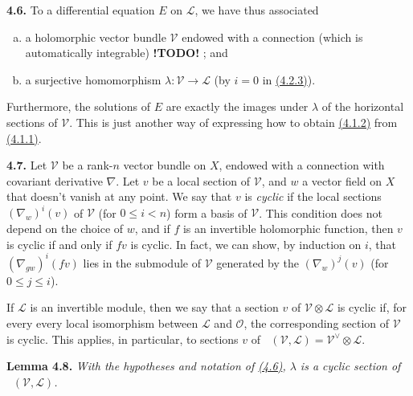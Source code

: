 \documentclass{report}
\newenvironment{itenv}[1]
  {\phantomsection\par\medskip\noindent\textbf{#1.}\itshape}
  {\medskip}
\newenvironment{rmenv}[1]
  {\phantomsection\par\medskip\noindent\textbf{#1.}\rmfamily}
  {\medskip}
\newcommand{\scr}[1]{{\mathscr{#1}}}
\renewcommand{\cal}[1]{{\mathcal{#1}}}
\renewcommand{\leq}{\leqslant}
\DeclareMathOperator{\shHom}{\underline{Hom}}
\newcommand{\todo}{\textbf{ !TODO! }}
\newcommand{\oldpage}[1]{\marginpar{\footnotesize$\Big\vert$ \textit{p.~#1}}}
\begin{document}
\begin{rmenv}{4.6}
\label{I.4.6}
  To a differential equation $E$ on $\scr{L}$, we have thus associated
  \begin{enumerate}[a)]
    \item a holomorphic vector bundle $\scr{V}$ endowed with a connection (which is automatically integrable) \todo ; and
    \item a surjective homomorphism $\lambda\colon\scr{V}\to\scr{L}$ (by $i=0$ in \hyperref[I.4.2.3]{(4.2.3)}).
  \end{enumerate}
  Furthermore, the solutions of $E$ are exactly the images under $\lambda$ of the horizontal sections of $\scr{V}$.
  This is just another way of expressing how to obtain \hyperref[I.4.1.2]{(4.1.2)} from \hyperref[I.4.1.1]{(4.1.1)}.
\end{rmenv}

\oldpage{26}
\begin{rmenv}{4.7}
\label{I.4.7}
  Let $\scr{V}$ be a rank-$n$ vector bundle on $X$, endowed with a connection with covariant derivative $\nabla$.
  Let $v$ be a local section of $\scr{V}$, and $w$ a vector field on $X$ that doesn't vanish at any point.
  We say that $v$ is \emph{cyclic} if the local sections $(\nabla_w)^i(v)$ of $\scr{V}$ (for $0\leq i<n$) form a basis of $\scr{V}$.
  This condition does not depend on the choice of $w$, and if $f$ is an invertible holomorphic function, then $v$ is cyclic if and only if $fv$ is cyclic.
  In fact, we can show, by induction on $i$, that $(\nabla_{gw})^i(fv)$ lies in the submodule of $\scr{V}$ generated by the $(\nabla_w)^j(v)$ (for $0\leq j\leq i$).

  If $\scr{L}$ is an invertible module, then we say that a section $v$ of $\scr{V}\otimes\scr{L}$ is cyclic if, for every every local isomorphism between $\scr{L}$ and $\cal{O}$, the corresponding section of $\scr{V}$ is cyclic.
  This applies, in particular, to sections $v$ of $\shHom(\scr{V},\scr{L})=\scr{V}^\vee\otimes\scr{L}$.
\end{rmenv}

\begin{itenv}{Lemma 4.8}
\label{I.4.8}
  With the hypotheses and notation of \hyperref[I.4.6]{(4.6)}, $\lambda$ is a cyclic section of $\shHom(\scr{V},\scr{L})$.
\end{itenv}
\end{document}
